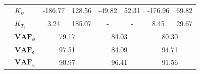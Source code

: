 \begin{table}[]
\begin{tabular}{llcccccc}
                                                   & $K_\psi $                                                          & -186.77                                     & 128.56                                              & -49.82                                      & 52.31                                               & -176.96                                     & 69.82                                               \\
                                                   & $K_{T_\delta}$                                                     & 3.24                                        & 185.07                                              & -                                           & -                                                   & 8.45                                        & 29.67                                               \\ \cline{2-8} 
                                                   & $\mathbf{VAF}_\phi$                                                & \multicolumn{2}{c}{79.17}                                                                         & \multicolumn{2}{c}{84.03}                                                                         & \multicolumn{2}{c}{80.30}                                                                         \\
                                                   & $\mathbf{VAF}_\delta$                                              & \multicolumn{2}{c}{97.51}                                                                         & \multicolumn{2}{c}{84.09}                                                                         & \multicolumn{2}{c}{94.71}                                                                         \\
                                                   & $\mathbf{VAF}_\psi$                                                & \multicolumn{2}{c}{90.97}                                                                         & \multicolumn{2}{c}{96.41}                                                                         & \multicolumn{2}{c}{91.56}                                                                        
    \end{tabular}
    \end{table}

